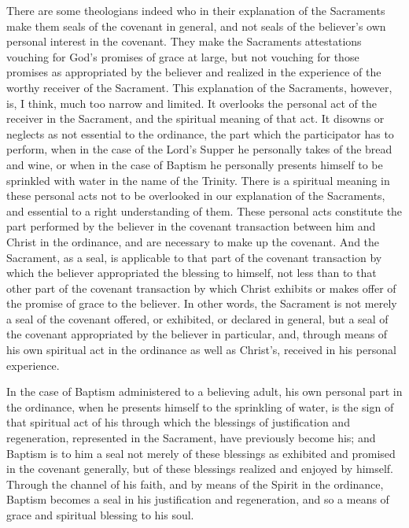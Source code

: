 \documentclass[]{book}
\begin{document}
There are some theologians indeed who in their explanation of the Sacraments make them seals of the covenant in general, and not seals of the believer's own personal interest in the covenant. They make the Sacraments attestations vouching for God's promises of grace at large, but not vouching for those promises as appropriated by the believer and realized in the experience of the worthy receiver of the Sacrament. This explanation of the Sacraments, however, is, I think, much too narrow and limited. It overlooks the personal act of the receiver in the Sacrament, and the spiritual meaning of that act. It disowns or neglects as not essential to the ordinance, the part which the participator has to perform, when in the case of the Lord's Supper he personally takes of the bread and wine, or when in the case of Baptism he personally presents himself to be sprinkled with water in the name of the Trinity. There is a spiritual meaning in these personal acts not to be overlooked in our explanation of the Sacraments, and essential to a right understanding of them. These personal acts constitute the part performed by the believer in the covenant transaction between him and Christ in the ordinance, and are necessary to make up the covenant. And the Sacrament, as a seal, is applicable to that part of the covenant transaction by which the believer appropriated the blessing to himself, not less than to that other part of the covenant transaction by which Christ exhibits or makes offer of the promise of grace to the believer. In other words, the Sacrament is not merely a seal of the covenant offered, or exhibited, or declared in general, but a seal of the covenant appropriated by the believer in particular, and, through means of his own spiritual act in the ordinance as well as Christ's, received in his personal experience.

In the case of Baptism administered to a believing adult, his own personal part in the ordinance, when he presents himself to the sprinkling of water, is the sign of that spiritual act of his through which the blessings of justification and regeneration, represented in the Sacrament, have previously become his; and Baptism is to him a seal not merely of these blessings as exhibited and promised in the covenant generally, but of these blessings realized and enjoyed by himself. Through the channel of his faith, and by means of the Spirit in the ordinance, Baptism becomes a seal in his justification and regeneration, and so a means of grace and spiritual blessing to his soul.
\end{document}
